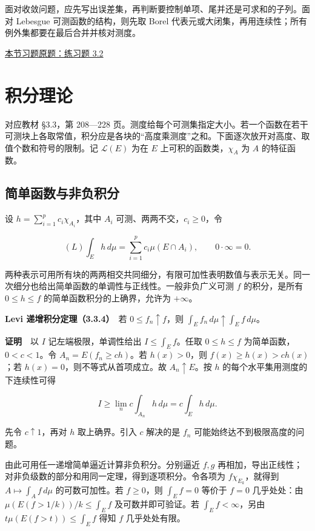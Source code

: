 \documentclass[11pt,a4paper]{article}
\begin{document}
面对收敛问题，应先写出误差集，再判断要控制单项、尾并还是可求和的子列。面对
Lebesgue 可测函数的结构，则先取 Borel
代表元或大闭集，再用连续性；所有例外集都要在最后合并并核对测度。

\noindent\hyperlink{ex2}{本节习题原题：练习题 3.2}

\section{积分理论}
对应教材 §3.3，第 208---228 页。测度给每个可测集指定大小。若一个函数在若干可测块上各取常值，积分应是各块的``高度乘测度''之和。下面逐次放开对高度、取值个数和符号的限制。记 \(\mathcal L(E)\) 为在 \(E\) 上可积的函数类，\(\chi_A\) 为 \(A\) 的特征函数。

\subsection*{简单函数与非负积分}\label{ux7b80ux5355ux51fdux6570ux4e0eux975eux8d1fux79efux5206}

设 \(h=\sum_{i=1}^p c_i\chi_{A_i}\)，其中 \(A_i\) 可测、两两不交，\(c_i\ge0\)，令

\[
(L)\int_E h\,d\mu=\sum_{i=1}^p c_i\mu(E\cap A_i),\qquad 0\cdot\infty=0.
\]

两种表示可用所有块的两两相交共同细分，有限可加性表明数值与表示无关。同一次细分也给出简单函数的单调性与正线性。一般非负广义可测 \(f\) 的积分，是所有 \(0\le h\le f\) 的简单函数积分的上确界，允许为 \(+\infty\)。

\textbf{Levi 递增积分定理（3.3.4）}　若 \(0\le f_n\uparrow f\)，则 \(\int_E f_n\,d\mu\uparrow\int_E f\,d\mu\)。

\textbf{证明}　以 \(I\) 记左端极限，单调性给出 \(I\le\int_E f\)。任取 \(0\le h\le f\) 为简单函数，\(0<c<1\)。令 \(A_n=E(f_n\ge ch)\)。若 \(h(x)>0\)，则 \(f(x)\ge h(x)>ch(x)\)；若 \(h(x)=0\)，则不等式从首项成立。故 \(A_n\uparrow E\)。按 \(h\) 的每个水平集用测度的下连续性可得

\[
I\ge\lim_n c\int_{A_n}h\,d\mu=c\int_E h\,d\mu.
\]

先令 \(c\uparrow1\)，再对 \(h\) 取上确界。引入 \(c\) 解决的是 \(f_n\) 可能始终达不到极限高度的问题。

由此可用任一递增简单逼近计算非负积分。分别逼近 \(f,g\) 再相加，导出正线性；对非负级数的部分和用同一定理，得到逐项积分。令各项为 \(f\chi_{E_k}\)，就得到 \(A\mapsto\int_A f\,d\mu\) 的可数可加性。若 \(f\ge0\)，则 \(\int_E f=0\) 等价于 \(f=0\) 几乎处处：由 \(\mu(E(f>1/k))/k\le\int_E f\) 及可数并即可验证。若 \(\int_E f<\infty\)，另由 \(t\mu(E(f>t))\le\int_E f\) 得知 \(f\) 几乎处处有限。
\end{document}
